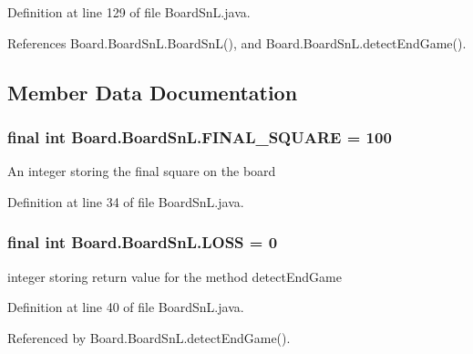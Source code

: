 Definition at line 129 of file Board\+Sn\+L.\+java.



References Board.\+Board\+Sn\+L.\+Board\+Sn\+L(), and Board.\+Board\+Sn\+L.\+detect\+End\+Game().



\subsection{Member Data Documentation}
\hypertarget{class_board_1_1_board_sn_l_a133b0d6726fc954ea12a66b4369e3fa6}{}
\subsubsection[{F\+I\+N\+A\+L\+\_\+\+S\+Q\+U\+A\+R\+E}]{\setlength{\rightskip}{0pt plus 5cm}final int Board.\+Board\+Sn\+L.\+F\+I\+N\+A\+L\+\_\+\+S\+Q\+U\+A\+R\+E = 100\hspace{0.3cm}{\ttfamily [private]}}\label{class_board_1_1_board_sn_l_a133b0d6726fc954ea12a66b4369e3fa6}
An integer storing the final square on the board 

Definition at line 34 of file Board\+Sn\+L.\+java.

\hypertarget{class_board_1_1_board_sn_l_aa6138411eddcd92ae999cff9fc34acb7}{}
\subsubsection[{L\+O\+S\+S}]{\setlength{\rightskip}{0pt plus 5cm}final int Board.\+Board\+Sn\+L.\+L\+O\+S\+S = 0\hspace{0.3cm}{\ttfamily [private]}}\label{class_board_1_1_board_sn_l_aa6138411eddcd92ae999cff9fc34acb7}
integer storing return value for the method detect\+End\+Game 

Definition at line 40 of file Board\+Sn\+L.\+java.



Referenced by Board.\+Board\+Sn\+L.\+detect\+End\+Game().

\hypertarget{class_board_1_1_board_sn_l_a98423adeb63e796de2d496689b4ce8e1}{}
